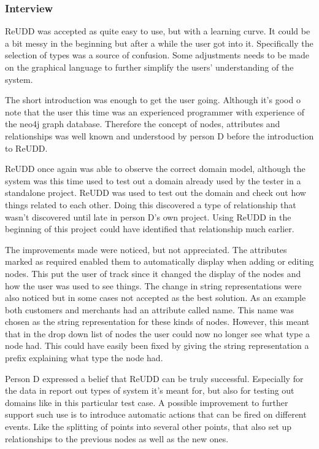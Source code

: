 \documentclass[a4paper]{report}
\begin{document}
\subsubsection{Interview}
ReUDD was accepted as quite easy to use, but with a learning curve. It could be a bit messy in the beginning but after a while the user got into it. Specifically the selection of types was a source of confusion. Some adjustments needs to be made on the graphical language to further simplify the users' understanding of the system.

The short introduction was enough to get the user going. Although it's good o note that the user this time was an experienced programmer with experience of the neo4j graph database. Therefore the concept of nodes, attributes and relationships was well known and understood by person D before the introduction to ReUDD.

ReUDD once again was able to observe the correct domain model, although the system was this time used to test out a domain already used by the tester in a standalone project. ReUDD was used to test out the domain and check out how things related to each other. Doing this discovered a type of relationship that wasn't discovered until late in person D's own project. Using ReUDD in the beginning of this project could have identified that relationship much earlier.

The improvements made were noticed, but not appreciated. The attributes marked as required enabled them to automatically display when adding or editing nodes. This put the user of track since it changed the display of the nodes and how the user was used to see things. The change in string representations were also noticed but in some cases not accepted as the best solution. As an example both customers and merchants had an attribute called name. This name was chosen as the string representation for these kinds of nodes. However, this meant that in the drop down list of nodes the user could now no longer see what type a node had. This could have easily been fixed by giving the string representation a prefix explaining what type the node had.

Person D expressed a belief that ReUDD can be truly successful. Especially for the data in report out types of system it's meant for, but also for testing out domains like in this particular test case. A possible improvement to further support such use is to introduce automatic actions that can be fired on different events. Like the splitting of points into several other points, that also set up relationships to the previous nodes as well as the new ones.
\end{document}
